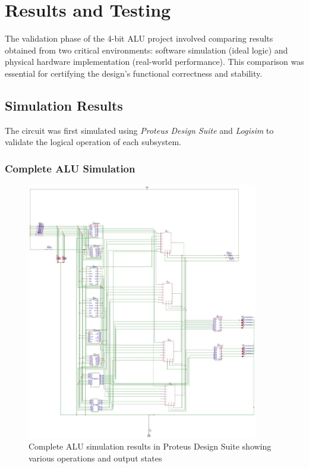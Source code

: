 \chapter{Results and Testing}

The validation phase of the 4-bit ALU project involved comparing results obtained from two critical environments: software simulation (ideal logic) and physical hardware implementation (real-world performance). This comparison was essential for certifying the design's functional correctness and stability.

\section{Simulation Results}

The circuit was first simulated using \textit{Proteus Design Suite} and \textit{Logisim} to validate the logical operation of each subsystem.

\subsection{Complete ALU Simulation}

\begin{figure}[h]
    \centering
    \includegraphics[width=0.9\textwidth]{simulation}
    \caption{Complete ALU simulation results in Proteus Design Suite showing various operations and output states}
    \label{fig:sim-complete}
\end{figure}

